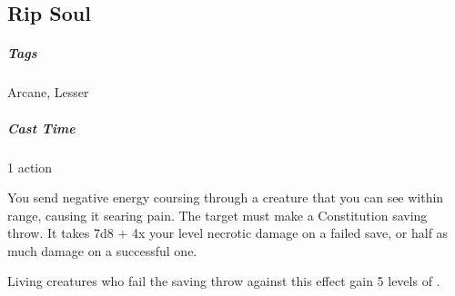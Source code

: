 



\subsection{Rip Soul}
\subparagraph*{Tags} Arcane, Lesser
\subparagraph*{Cast Time} 1 action

You send negative energy coursing through a creature that you can see within range, causing it searing pain. The target must make a Constitution saving throw. It takes 7d8 + 4x your level necrotic damage on a failed save, or half as much damage on a successful one.

Living creatures who fail the saving throw against this effect gain 5 levels of .








